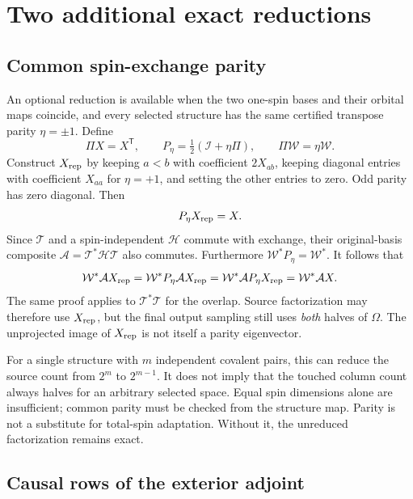 \documentclass[11pt,a4paper]{article}
\newcommand{\Tr}{^{\mathsf T}}
\newcommand{\Wa}{\mathcal W}
\newcommand{\Ta}{\mathcal T}
\newcommand{\Ha}{\mathcal H}
\newcommand{\Id}{\mathcal I}
\begin{document}
\section{Two additional exact reductions}

\subsection{Common spin-exchange parity}

An optional reduction is available when the two one-spin bases and their
orbital maps coincide, and every selected structure has the same certified
transpose parity $\eta=\pm1$. Define
\begin{equation}
 \Pi X=X\Tr,\qquad P_\eta=\tfrac12(\Id+\eta\Pi),\qquad
 \Pi\Wa=\eta\Wa.
\end{equation}
Construct $X_{\rm rep}$ by keeping $a<b$ with coefficient $2X_{ab}$,
keeping diagonal entries with coefficient $X_{aa}$ for $\eta=+1$, and
setting the other entries to zero. Odd parity has zero diagonal. Then
\begin{equation}
 P_\eta X_{\rm rep}=X.
\end{equation}
Since $\Ta$ and a spin-independent $\Ha$ commute with exchange,
their original-basis composite $\mathcal A=\Ta^*\Ha\Ta$ also commutes.
Furthermore $\Wa^*P_\eta=\Wa^*$. It follows that
\begin{equation}
 \Wa^*\mathcal A X_{\rm rep}
 =\Wa^*P_\eta\mathcal A X_{\rm rep}
 =\Wa^*\mathcal A P_\eta X_{\rm rep}
 =\Wa^*\mathcal A X.
\end{equation}
The same proof applies to $\Ta^*\Ta$ for the overlap. Source factorization
may therefore use $X_{\rm rep}$, but the final output sampling still uses
\emph{both} halves of $\Omega$. The unprojected image of $X_{\rm rep}$
is not itself a parity eigenvector.

For a single structure with $m$ independent covalent pairs, this can reduce
the source count from $2^m$ to $2^{m-1}$. It does not imply that the touched
column count always halves for an arbitrary selected space. Equal spin
dimensions alone are insufficient; common parity must be checked from the
structure map. Parity is not a substitute for total-spin adaptation.
Without it, the unreduced factorization remains exact.

\subsection{Causal rows of the exterior adjoint}
\end{document}
